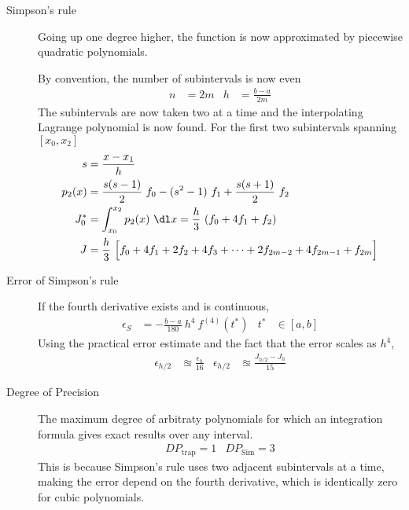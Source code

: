 \begin{description}
    \item[Simpson's rule] Going up one degree higher, the function is now approximated by
        piecewise quadratic polynomials. \par
        By convention, the number of subintervals is now even
        \begin{align}
            n & = 2m & h & = \frac{b-a}{2m}
        \end{align}
        The subintervals are now taken two at a time and the interpolating Lagrange
        polynomial is now found. For the first two subintervals spanning $ [x_0, x_2] $
        \begin{align}
            s      & = \frac{x - x_1}{h}                                               \\
            p_2(x) & = \frac{s(s-1)}{2}\ f_0 - (s^2 - 1)\ f_1 + \frac{s(s+1)}{2}
            \ f_2                                                                      \\
            J_0^*  & = \int_{x_0}^{x_2} p_2(x)\ \dl x = \frac{h}{3}\ (f_0 + 4f_1
            + f_2)                                                                     \\
            J      & = \frac{h}{3}\ \Big[ f_0 + 4f_1 + 2f_2 + 4f_3 + \dots + 2f_{2m-2}
                + 4f_{2m-1} + f_{2m} \Big]
        \end{align}

    \item[Error of Simpson's rule] If the fourth derivative exists and is continuous,
        \begin{align}
            \epsilon_S & = -\frac{b-a}{180}\ h^4\ f^{(4)}(t^*) &
            t^*        & \in [a, b]
        \end{align}
        Using the practical error estimate and the fact that the error scales
        as $ h^4 $,
        \begin{align}
            \epsilon_{h/2} & \approxeq \frac{\epsilon_h}{16}    &
            \epsilon_{h/2} & \approxeq \frac{J_{h/2} - J_h}{15}
        \end{align}

    \item[Degree of Precision] The maximum degree of arbitraty polynomials for which an
        integration formula gives exact results over any interval.
        \begin{align}
            DP_{\text{trap}} = 1 & DP_{\text{Sim}} = 3
        \end{align}
        This is because Simpson's rule uses two adjacent subintervals at a time, making
        the error depend on the fourth derivative, which is identically zero for cubic
        polynomials.


\end{description}

